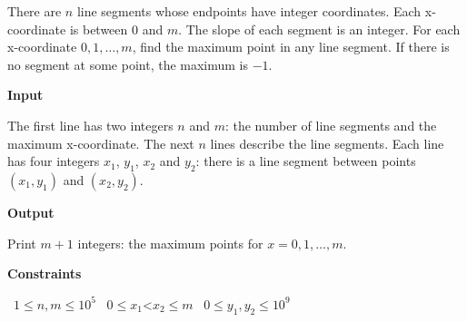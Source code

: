 There are $n$ line segments whose endpoints have integer coordinates. Each x-coordinate is between $0$ and $m$. The slope of each segment is an integer.
For each x-coordinate $0,1,\dots,m$, find the maximum point in any line segment. If there is no segment at some point, the maximum is $-1$.

\vspace{0.3cm}\noindent\textbf{Input}

The first line has two integers $n$ and $m$: the number of line segments and the maximum x-coordinate.
The next $n$ lines describe the line segments. Each line has four integers $x_1$, $y_1$, $x_2$ and $y_2$: there is a line segment between points $(x_1,y_1)$ and $(x_2,y_2)$.

\vspace{0.3cm}\noindent\textbf{Output}

Print $m+1$ integers: the maximum points for $x=0,1,\dots,m$.

\vspace{0.3cm}\noindent\textbf{Constraints}

\textbullet\ $1 \le n, m \le 10^5$
\textbullet\ $0 \le x_1 $<$ x_2 \le m$
\textbullet\ $0 \le y_1,y_2 \le 10^9$
